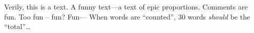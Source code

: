 
Verily, this is a text.
A funny text---a text of epic proportions.
Comments are fun. %
Too fun -- fun? Fun---
When words are ``counted'', 30 words \emph{should} be the ``total''\dots{}
